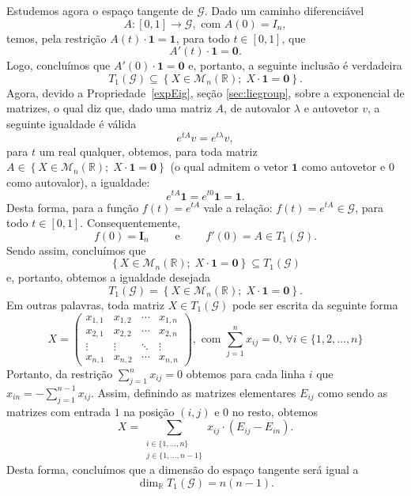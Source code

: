 \documentclass[twoside,openright,titlepage,numbers=noenddot,headinclude,  lineheaders footinclude=true,cleardoublepage=empty,
                                BCOR=5mm,paper=a4,fontsize=12pt ]{scrbook}
\theoremstyle{definition}
\begin{document}
Estudemos agora o espaço tangente de $\mathcal{G}$. Dado um caminho diferenciável 
\[A: [0,1] \rightarrow \mathcal{G}, \text{ com } A(0)= I_n,\]
temos, pela restrição $A(t) \cdot \mathbf{1} = \mathbf{1}$,
para todo $t \in [0,1]$, que
\[ A'(t) \cdot \mathbf{1} = \mathbf{0}. \]
Logo, concluímos que $A'(0) \cdot \mathbf{1} = \mathbf{0}$ e, portanto, %
a seguinte inclusão é verdadeira
\[ T_1(\mathcal{G}) \subseteq \left\{ X \in \mathcal{M}_n( \mathbb{R} ); \; X \cdot \mathbf{1} = \mathbf{0} \right\}. \]
Agora, devido a Propriedade~\ref{expEig}, seção \ref{sec:liegroup},
 sobre a exponencial de matrizes, o qual diz que, dado uma matriz $A$, de autovalor $\lambda$
e autovetor $v$, a seguinte igualdade é válida
\[
e^{t A}v = e^{t \lambda}v, 
\]
para $t$ um real qualquer,  obtemos, para toda matriz $A \in 
\left\{ X \in \mathcal{M}_n( \mathbb{R} ); \; X \cdot \mathbf{1} = \mathbf{0} \right\}$ (o qual 
admitem o vetor $\bm{1}$ como autovetor e $0$ como autovalor), a igualdade:
\[
e^{tA} \bm{1} = e^{t 0} \bm{1} = \bm{1}.
\]
Desta forma, para a
função $f(t) = e^{tA}$ vale a relação:
$f(t) = e^{tA} \in \mathcal{G}$, para todo $t \in [0,1]$. Consequentemente,
\[
f(0) = \bm{I}_n \qquad \text{ e } \qquad f'(0) = A \in T_1(\mathcal{G}).
\]
Sendo assim, concluímos que
\[ \left\{ X \in \mathcal{M}_n( \mathbb{R} ); \; X \cdot \mathbf{1} = \mathbf{0} \right\} \subseteq T_1(\mathcal{G}) \]
e, portanto, obtemos a igualdade desejada
\[ T_1(\mathcal{G}) = \left\{ X \in \mathcal{M}_n( \mathbb{R} ); \; X \cdot \mathbf{1} = \mathbf{0} \right\}. \]
Em outras palavras, toda matriz $X \in T_1(\mathcal{G})$ pode ser escrita da seguinte forma
\[
X = 
 \begin{pmatrix}
  x_{1,1} & x_{1,2} & \cdots & x_{1,n} \\
  x_{2,1} & x_{2,2} & \cdots & x_{2,n} \\
  \vdots  & \vdots  & \ddots & \vdots  \\
  x_{n,1} & x_{n,2} & \cdots & x_{n,n} 
 \end{pmatrix}
, 
\text{ com  } \sum_{j = 1}^n x_{ij} = 0, \, \forall i \in \{1, 2, \ldots, n\}
\]
Portanto, da restrição $\sum_{j = 1}^n x_{ij} = 0$ obtemos para cada linha $i$ que $x_{in} = - \sum_{j = 1}^{n-1} x_{ij}$.
Assim, definindo as matrizes elementares $E_{ij}$ como sendo as matrizes com entrada $1$ na posição $(i,j)$ e $0$ no resto,
obtemos
\[ X = \sum_{ 
	\substack{ i \in \{1,\ldots,n\} \\
		   j \in \{1,\ldots, n-1\} } 
            } 
         x_{ij} \cdot ( E_{ij} - E_{in} ). \]
Desta forma, concluímos que a dimensão do espaço tangente será igual a
\[\dim_{\mathbb{R}} T_1(\mathcal{G}) = n(n - 1).\]
\end{document}
